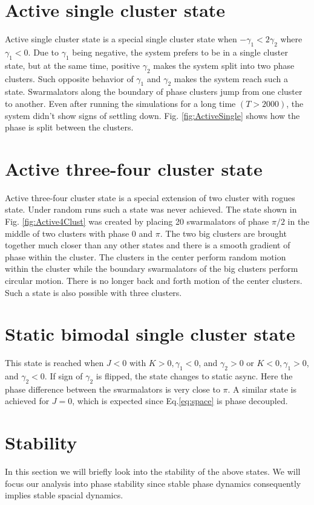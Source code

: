 \documentclass[superscriptaddress,reprint,amssymb, amsmath,aps, pre]{revtex4-1}
\begin{document}
{    \section{Active single cluster state}
    {
        Active single cluster state is a special single cluster state when \(-\gamma_1 < 2\gamma_2\) where \(\gamma_1 < 0\). Due to \(\gamma_1\) being negative, the system prefers to be in a single cluster state, but at the same time, positive \(\gamma_2\) makes the system split into two phase clusters. Such opposite behavior of \(\gamma_1\) and \(\gamma_2\) makes the system reach such a state. Swarmalators along the boundary of phase clusters jump from one cluster to another. Even after running the simulations for a long time \((T > 2000)\), the system didn't show signs of settling down. Fig. \ref{fig:ActiveSingle} shows how the phase is split between the clusters. 
    }
    \section{Active three-four cluster state}
    {
        Active three-four cluster state is a special extension of two cluster with rogues state. Under random runs such a state was never achieved. The state shown in Fig. \ref{fig:Active4Clust} was created by placing 20 swarmalators of phase \(\pi/2\) in the middle of two clusters with phase \(0\) and \(\pi\). The two big clusters are brought together much closer than any other states and there is a smooth gradient of phase within the cluster. The clusters in the center perform random motion within the cluster while the boundary swarmalators of the big clusters perform circular motion. There is no longer back and forth motion of the center clusters. Such a state is also possible with three clusters.
    }
    \section{Static bimodal single cluster state}
    {
        This state is reached when \(J < 0\) with \(K > 0, \gamma_1 < 0\), and \(\gamma_2 > 0\) or \(K < 0, \gamma_1>0\), and \(\gamma_2 < 0\). If sign of \(\gamma_2\) is flipped, the state changes to static async. Here the phase difference between the swarmalators is very close to \(\pi\). A similar state is achieved for \(J = 0\), which is expected since Eq.\ref{eq:space} is phase decoupled. 
    }
    \section{Stability}
    {
        In this section we will briefly look into the stability of the above states. We will focus our analysis into phase stability since stable phase dynamics consequently implies stable spacial dynamics. 
        
}}
\end{document}
